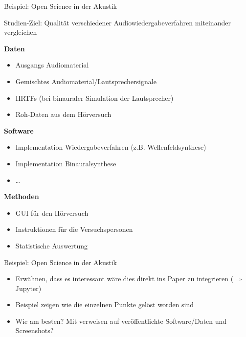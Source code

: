 \documentclass{beamer}
\begin{document}
\begin{frame}{Beispiel: Open Science in der Akustik}

    Studien-Ziel: Qualität verschiedener Audiowiedergabeverfahren miteinander
    vergleichen

    \textbf{Daten}
    \begin{itemize}
        \item Ausgangs Audiomaterial
        \item Gemischtes Audiomaterial/Lautsprechersignale
        \item HRTFs (bei binauraler Simulation der Lautsprecher)
        \item Roh-Daten aus dem Hörversuch
    \end{itemize}

    \textbf{Software}
    \begin{itemize}
        \item Implementation Wiedergabeverfahren (z.B. Wellenfeldsynthese)
        \item Implementation Binauralsynthese
        \item \dots
    \end{itemize}

    \textbf{Methoden}
    \begin{itemize}
        \item GUI für den Hörversuch
        \item Instruktionen für die Versuchspersonen
        \item Statistische Auswertung
    \end{itemize}

\end{frame}

\begin{frame}{Beispiel: Open Science in der Akustik}

    \begin{itemize}
        \item Erwähnen, dass es interessant wäre dies direkt ins Paper zu
            integrieren ($\Rightarrow$ Jupyter)
        \item Beispiel zeigen wie die einzelnen Punkte gelöst worden sind
        \item Wie am besten? Mit verweisen auf veröffentlichte Software/Daten
            und Screenshots?
    \end{itemize}

\end{frame}
\end{document}
